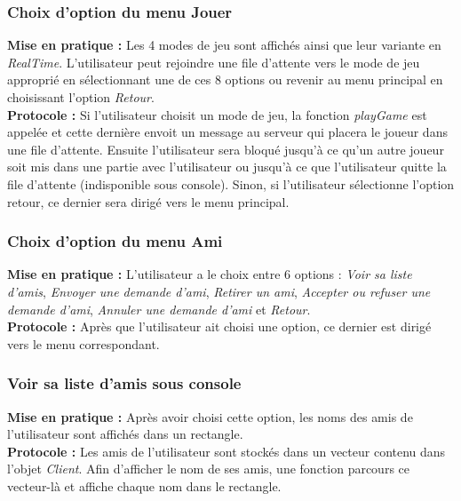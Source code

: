 \documentclass[10pt, a4paper]{article}
\begin{document}
\subsubsection{Choix d'option du menu Jouer}
\textbf{Mise en pratique :} Les 4 modes de jeu sont affichés ainsi que leur variante en \textit{RealTime}. L'utilisateur peut rejoindre une file d'attente vers le mode de jeu approprié en sélectionnant une de ces 8 options ou revenir au menu principal en choisissant l'option \textit{Retour}.\\
\textbf{Protocole :} Si l'utilisateur choisit un mode de jeu, la fonction \textit{playGame} est appelée et cette dernière envoit un message au serveur qui placera le joueur dans une file d'attente. Ensuite l'utilisateur sera bloqué jusqu'à ce qu'un autre joueur soit mis dans une partie avec l'utilisateur ou jusqu'à ce que l'utilisateur quitte la file d'attente (indisponible sous console). Sinon, si l'utilisateur sélectionne l'option retour, ce dernier sera dirigé vers le menu principal.\\

\subsubsection{Choix d'option du menu Ami}
\textbf{Mise en pratique :} L'utilisateur a le choix entre 6 options : \textit{Voir sa liste d'amis}, \textit{Envoyer une demande d'ami}, \textit{Retirer un ami}, \textit{Accepter ou refuser une demande d'ami}, \textit{Annuler une demande d'ami} et \textit{Retour}.\\
\textbf{Protocole :} Après que l'utilisateur ait choisi une option, ce dernier est dirigé vers le menu correspondant. \\

\subsubsection{Voir sa liste d'amis sous console}
\textbf{Mise en pratique :} Après avoir choisi cette option, les noms des amis de l'utilisateur sont affichés dans un rectangle.\\
\textbf{Protocole :} Les amis de l'utilisateur sont stockés dans un vecteur contenu dans l'objet \textit{Client}. Afin d'afficher le nom de ses amis, une fonction parcours ce vecteur-là et affiche chaque nom dans le rectangle. \\
\end{document}
